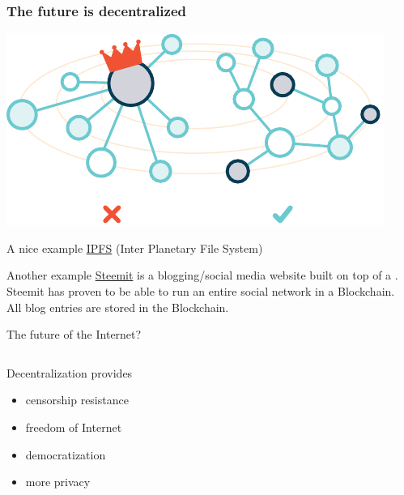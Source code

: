 \documentclass[notitlepage, usenames,dvipsnames]{beamer}
\newcommand{\st}{\structure}
\begin{document}
    \begin{frame}
        \frametitle{The future is decentralized}

         {
            \centering\includegraphics[scale=0.5]{../img/ipfs.pdf}

            \begin{exampleblock}{A nice example}
                \href{https://ipfs.io/}{IPFS} (Inter Planetary File System)
            \end{exampleblock}

            \begin{exampleblock}{Another example}
                \href{https://steemit.com/}{Steemit} is a blogging/social media website built on top of a \st{Blockchain}.\\[1ex]

                Steemit has proven to be able to run an entire social network in a Blockchain.\\[1ex]

                All blog entries are stored in the Blockchain.
            \end{exampleblock}
        }

         {
            \vspace{-2em}
            \begin{center}{\huge The future of the Internet?}\end{center}

            \vspace{2em}
            \begin{columns}
                \centering
                \begin{minipage}{5cm}
                \begin{block}{Decentralization provides}
                    \begin{itemize}
                        \item censorship resistance
                        \item freedom of Internet
                        \item democratization
                        \item more privacy
                    \end{itemize}
                \end{block}
                \end{minipage}


\end{columns}}
\end{frame}
\end{document}
